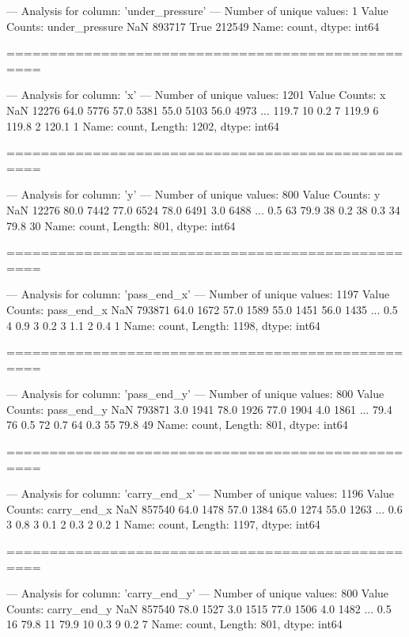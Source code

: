 --- Analysis for column: 'under_pressure' ---
Number of unique values: 1
Value Counts:
under_pressure
NaN     893717
True    212549
Name: count, dtype: int64

==================================================

--- Analysis for column: 'x' ---
Number of unique values: 1201
Value Counts:
x
NaN      12276
64.0      5776
57.0      5381
55.0      5103
56.0      4973
         ...  
119.7       10
0.2          7
119.9        6
119.8        2
120.1        1
Name: count, Length: 1202, dtype: int64

==================================================

--- Analysis for column: 'y' ---
Number of unique values: 800
Value Counts:
y
NaN     12276
80.0     7442
77.0     6524
78.0     6491
3.0      6488
        ...  
0.5        63
79.9       38
0.2        38
0.3        34
79.8       30
Name: count, Length: 801, dtype: int64

==================================================

--- Analysis for column: 'pass_end_x' ---
Number of unique values: 1197
Value Counts:
pass_end_x
NaN     793871
64.0      1672
57.0      1589
55.0      1451
56.0      1435
         ...  
0.5          4
0.9          3
0.2          3
1.1          2
0.4          1
Name: count, Length: 1198, dtype: int64

==================================================

--- Analysis for column: 'pass_end_y' ---
Number of unique values: 800
Value Counts:
pass_end_y
NaN     793871
3.0       1941
78.0      1926
77.0      1904
4.0       1861
         ...  
79.4        76
0.5         72
0.7         64
0.3         55
79.8        49
Name: count, Length: 801, dtype: int64

==================================================

--- Analysis for column: 'carry_end_x' ---
Number of unique values: 1196
Value Counts:
carry_end_x
NaN     857540
64.0      1478
57.0      1384
65.0      1274
55.0      1263
         ...  
0.6          3
0.8          3
0.1          2
0.3          2
0.2          1
Name: count, Length: 1197, dtype: int64

==================================================

--- Analysis for column: 'carry_end_y' ---
Number of unique values: 800
Value Counts:
carry_end_y
NaN     857540
78.0      1527
3.0       1515
77.0      1506
4.0       1482
         ...  
0.5         16
79.8        11
79.9        10
0.3          9
0.2          7
Name: count, Length: 801, dtype: int64

